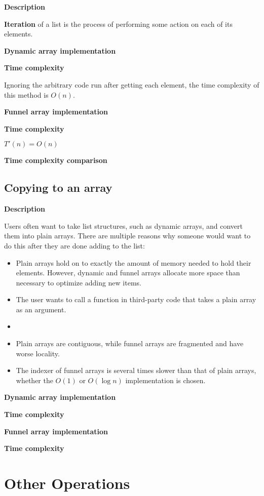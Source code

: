 \documentclass{article}
\newcommand{\descriptn}{\textbf{Description}}
\newcommand{\dynarrayimpl}{\textbf{Dynamic array implementation}}
\newcommand{\funarrayimpl}{\textbf{Funnel array implementation}}
\newcommand{\tcomplex}{\textbf{Time complexity}}
\newcommand{\tcomplexcmp}{\textbf{Time complexity comparison}}
\newcommand{\timefn}{T}
\newcommand{\timenewfn}{\timefn'}
\newcommand{\bigo}{O}
\newcommand{\varnitems}{n}
\begin{document}
	\descriptn
	
	\textbf{Iteration} of a list is the process of performing some action on each of its elements.
	
	\dynarrayimpl
	
	\tcomplex
	
	Ignoring the arbitrary code run after getting each element, the time complexity of this method is $\bigo(\varnitems)$.
	
	\funarrayimpl
	
	\tcomplex
	
	$\timenewfn(\varnitems) = \bigo(\varnitems)$
	
	\tcomplexcmp
	
	\subsection{Copying to an array}
	
	\descriptn
	
	Users often want to take list structures, such as dynamic arrays, and convert them into plain arrays. There are multiple reasons why someone would want to do this after they are done adding to the list:
	
	\begin{itemize}
		\item Plain arrays hold on to exactly the amount of memory needed to hold their elements. However, dynamic and funnel arrays allocate more space than necessary to optimize adding new items.
		\item The user wants to call a function in third-party code that takes a plain array as an argument.
		\item
		\item Plain arrays are contiguous, while funnel arrays are fragmented and have worse locality.
		\item The indexer of funnel arrays is several times slower than that of plain arrays, whether the $\bigo(1)$ or $\bigo(\log \varnitems)$ implementation is chosen.
	\end{itemize}
	
	\dynarrayimpl
	
	\tcomplex
	
	\funarrayimpl
	
	\tcomplex
	
	\section{Other Operations}
	
\end{document}
